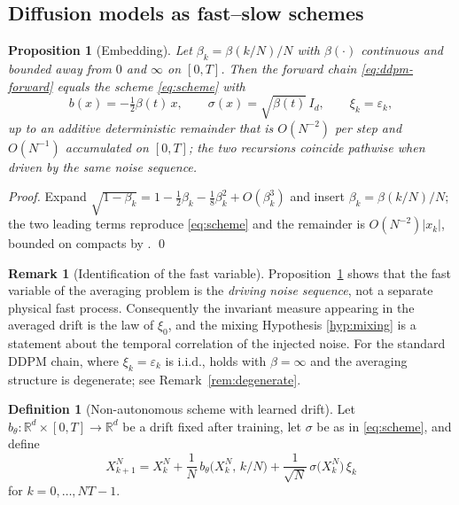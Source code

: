 \documentclass[a4paper,fleqn]{cas-dc}
\newtheorem{proposition}[theorem]{Proposition}
\theoremstyle{definition}
\newtheorem{definition}[theorem]{Definition}
\newtheorem{remark}[theorem]{Remark}
\newcommand{\R}{\mathbb{R}}
\begin{document}
\subsection{Diffusion models as fast--slow schemes}

\begin{proposition}[Embedding]
\label{prop:embedding}
Let $\beta_{k} = \beta(k/N)/N$ with $\beta(\cdot)$ continuous and bounded away from
$0$ and $\infty$ on $[0,T]$. Then the forward chain \eqref{eq:ddpm-forward} equals
the scheme \eqref{eq:scheme} with
\begin{equation}
b(x) = -\tfrac{1}{2}\beta(t)\,x,\qquad
\sigma(x) = \sqrt{\beta(t)}\,I_{d},\qquad
\xi_{k} = \varepsilon_{k},
\end{equation}
up to an additive deterministic remainder that is $O(N^{-2})$ per step and
$O(N^{-1})$ accumulated on $[0,T]$; the two recursions coincide pathwise when
driven by the same noise sequence.
\end{proposition}

\begin{proof}
Expand $\sqrt{1-\beta_{k}} = 1 - \tfrac{1}{2}\beta_{k} - \tfrac{1}{8}\beta_{k}^{2} +
O(\beta_{k}^{3})$ and insert $\beta_{k}=\beta(k/N)/N$; the two leading terms reproduce
\eqref{eq:scheme} and the remainder is $O(N^{-2})\lvert x_{k}\rvert$, bounded on
compacts by . \qed
\end{proof}


\begin{remark}[Identification of the fast variable]
\label{rem:fastvar}
Proposition~\ref{prop:embedding} shows that the fast variable of the averaging problem is the
\emph{driving noise sequence}, not a separate physical fast process. Consequently the
invariant measure appearing in the averaged drift is the law of $\xi_{0}$, and the
mixing Hypothesis \ref{hyp:mixing} is a statement about the temporal correlation of
the injected noise. For the standard DDPM chain, where $\xi_{k}=\varepsilon_{k}$ is
i.i.d.,  holds with $\beta=\infty$ and the averaging structure is
degenerate; see Remark~\ref{rem:degenerate}.
\end{remark}

\begin{definition}[Non-autonomous scheme with learned drift]
\label{def:scheme-na}
Let $b_{\theta}:\R^{d}\times[0,T]\to\R^{d}$ be a drift fixed after training, let
$\sigma$ be as in \eqref{eq:scheme}, and define
\begin{equation}
X^{N}_{k+1}=X^{N}_{k}+\frac{1}{N}\,b_{\theta}\bigl(X^{N}_{k},\,k/N\bigr)
+\frac{1}{\sqrt{N}}\,\sigma\bigl(X^{N}_{k}\bigr)\,\xi_{k}
\label{eq:scheme-na}
\end{equation}
for $k=0,\dots,NT-1$.
\end{definition}
\end{document}
